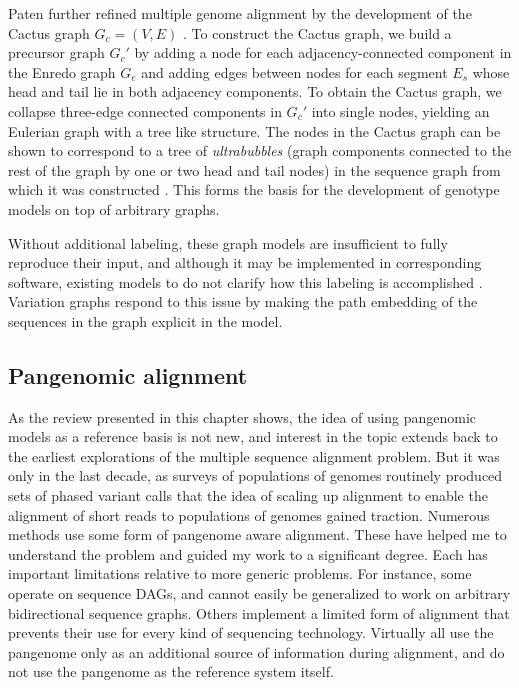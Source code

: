 Paten further refined multiple genome alignment by the development of the Cactus graph $G_c = (V,E)$ \cite{paten2011cactus}.
To construct the Cactus graph, we build a precursor graph $G_c'$ by adding a node for each adjacency-connected component in the Enredo graph $G_e$ and adding edges between nodes for each segment $E_s$ whose head and tail lie in both adjacency components.
To obtain the Cactus graph, we collapse three-edge connected components in $G_c'$ into single nodes, yielding an Eulerian graph with a tree like structure.
The nodes in the Cactus graph can be shown to correspond to a tree of \emph{ultrabubbles} (graph components connected to the rest of the graph by one or two head and tail nodes) in the sequence graph from which it was constructed \cite{paten2018superbubbles}.
This forms the basis for the development of genotype models on top of arbitrary graphs.

Without additional labeling, these graph models are insufficient to fully reproduce their input, and although it may be implemented in corresponding software, existing models to do not clarify how this labeling is accomplished \cite{kehr2014genome}.
Variation graphs respond to this issue by making the path embedding of the sequences in the graph explicit in the model.

\subsection{Pangenomic alignment}

As the review presented in this chapter shows, the idea of using pangenomic models as a reference basis is not new, and interest in the topic extends back to the earliest explorations of the multiple sequence alignment problem.
But it was only in the last decade, as surveys of populations of genomes routinely produced sets of phased variant calls \cite{liti2009population,weigel20091001,cao2011whole,1000Gphase1,1000g2015} that the idea of scaling up alignment to enable the alignment of short reads to populations of genomes gained traction.
Numerous methods use some form of pangenome aware alignment.
These have helped me to understand the problem and guided my work to a significant degree.
Each has important limitations relative to more generic problems.
For instance, some operate on sequence DAGs, and cannot easily be generalized to work on arbitrary bidirectional sequence graphs.
Others implement a limited form of alignment that prevents their use for every kind of sequencing technology.
Virtually all use the pangenome only as an additional source of information during alignment, and do not use the pangenome as the reference system itself.

